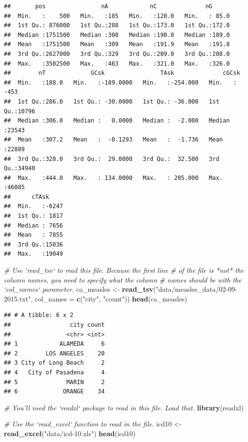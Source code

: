 \documentclass[]{book}
\makeatletter
\newenvironment{Shaded}{\begin{snugshade}}{\end{snugshade}}
\newcommand{\KeywordTok}[1]{\textcolor[rgb]{0.13,0.29,0.53}{\textbf{#1}}}
\newcommand{\DataTypeTok}[1]{\textcolor[rgb]{0.13,0.29,0.53}{#1}}
\newcommand{\StringTok}[1]{\textcolor[rgb]{0.31,0.60,0.02}{#1}}
\newcommand{\CommentTok}[1]{\textcolor[rgb]{0.56,0.35,0.01}{\textit{#1}}}
\newcommand{\NormalTok}[1]{#1}
\newenvironment{kframe}{%
\medskip{}
\setlength{\fboxsep}{.8em}
 \def\at@end@of@kframe{}%
 \ifinner\ifhmode%
  \def\at@end@of@kframe{\end{minipage}}%
  \begin{minipage}{\columnwidth}%
 \fi\fi%
 \def\FrameCommand##1{\hskip\@totalleftmargin \hskip-\fboxsep
 \colorbox{shadecolor}{##1}\hskip-\fboxsep
     \hskip-\linewidth \hskip-\@totalleftmargin \hskip\columnwidth}%
 \MakeFramed {\advance\hsize-\width
   \@totalleftmargin\z@ \linewidth\hsize
   \@setminipage}}%
 {\par\unskip\endMakeFramed%
 \at@end@of@kframe}
\renewenvironment{Shaded}{\begin{kframe}}{\end{kframe}}
\theoremstyle{definition}
\theoremstyle{definition}
\theoremstyle{definition}
\theoremstyle{remark}
\makeatother
\begin{document}
\begin{verbatim}
##       pos                nA            nC              nG       
##  Min.   :    500   Min.   :185   Min.   :120.0   Min.   : 85.0  
##  1st Qu.: 876000   1st Qu.:288   1st Qu.:173.0   1st Qu.:172.0  
##  Median :1751500   Median :308   Median :190.0   Median :189.0  
##  Mean   :1751500   Mean   :309   Mean   :191.9   Mean   :191.8  
##  3rd Qu.:2627000   3rd Qu.:329   3rd Qu.:209.0   3rd Qu.:208.0  
##  Max.   :3502500   Max.   :463   Max.   :321.0   Max.   :326.0  
##        nT             GCsk                TAsk              cGCsk      
##  Min.   :188.0   Min.   :-189.0000   Min.   :-254.000   Min.   : -453  
##  1st Qu.:286.0   1st Qu.: -30.0000   1st Qu.: -36.000   1st Qu.:10796  
##  Median :306.0   Median :   0.0000   Median :  -2.000   Median :23543  
##  Mean   :307.2   Mean   :  -0.1293   Mean   :  -1.736   Mean   :22889  
##  3rd Qu.:328.0   3rd Qu.:  29.0000   3rd Qu.:  32.500   3rd Qu.:34940  
##  Max.   :444.0   Max.   : 134.0000   Max.   : 205.000   Max.   :46085  
##      cTAsk      
##  Min.   :-6247  
##  1st Qu.: 1817  
##  Median : 7656  
##  Mean   : 7855  
##  3rd Qu.:15036  
##  Max.   :19049
\end{verbatim}

\begin{Shaded}
\begin{Highlighting}[]
\CommentTok{# Use `read_tsv` to read this file. Because the first line}
\CommentTok{# of the file is *not* the column names, you need to specify what the column}
\CommentTok{# names should be with the `col_names` parameter. }
\NormalTok{ca_measles <-}\StringTok{ }\KeywordTok{read_tsv}\NormalTok{(}\StringTok{"data/measles_data/02-09-2015.txt"}\NormalTok{,}
                       \DataTypeTok{col_names =} \KeywordTok{c}\NormalTok{(}\StringTok{"city"}\NormalTok{, }\StringTok{"count"}\NormalTok{))}
\KeywordTok{head}\NormalTok{(ca_measles)}
\end{Highlighting}
\end{Shaded}

\begin{verbatim}
## # A tibble: 6 x 2
##                 city count
##                <chr> <int>
## 1            ALAMEDA     6
## 2        LOS ANGELES    20
## 3 City of Long Beach     2
## 4   City of Pasadena     4
## 5              MARIN     2
## 6             ORANGE    34
\end{verbatim}

\begin{Shaded}
\begin{Highlighting}[]
\CommentTok{# You'll need the `readxl` package to read in this file. Load that. }
\KeywordTok{library}\NormalTok{(readxl)}

\CommentTok{# Use the `read_excel` function to read in the file. }
\NormalTok{icd10 <-}\StringTok{ }\KeywordTok{read_excel}\NormalTok{(}\StringTok{"data/icd-10.xls"}\NormalTok{)}
\KeywordTok{head}\NormalTok{(icd10)}
\end{Highlighting}
\end{Shaded}
\end{document}
